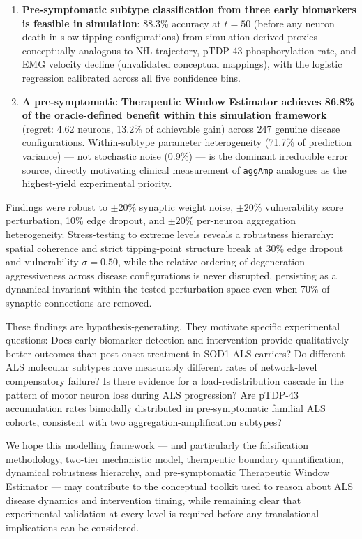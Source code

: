 \documentclass[12pt,a4paper]{article}
\begin{document}
\begin{enumerate}
\item \textbf{Pre-symptomatic subtype classification from three early biomarkers is feasible in
simulation}: 88.3\% accuracy at $t=50$ (before any neuron death in slow-tipping configurations)
from simulation-derived proxies conceptually analogous to NfL trajectory, pTDP-43
phosphorylation rate, and EMG velocity decline (unvalidated conceptual mappings), with the
logistic regression calibrated across all five confidence bins.

\item \textbf{A pre-symptomatic Therapeutic Window Estimator achieves 86.8\% of the oracle-defined
benefit within this simulation framework} (regret: 4.62 neurons, 13.2\% of achievable gain) across 247 genuine disease
configurations. Within-subtype parameter heterogeneity (71.7\% of prediction variance) --- not
stochastic noise (0.9\%) --- is the dominant irreducible error source, directly motivating
clinical measurement of \texttt{aggAmp} analogues as the highest-yield experimental priority.
\end{enumerate}

Findings were robust to $\pm 20\%$ synaptic weight noise, $\pm 20\%$ vulnerability score
perturbation, 10\% edge dropout, and $\pm 20\%$ per-neuron aggregation heterogeneity.
Stress-testing to extreme levels reveals a robustness hierarchy: spatial coherence and strict
tipping-point structure break at 30\% edge dropout and vulnerability $\sigma = 0.50$, while
the relative ordering of degeneration aggressiveness across disease configurations is never
disrupted, persisting as a dynamical invariant within the tested perturbation space even when 70\% of synaptic connections are
removed.

These findings are hypothesis-generating. They motivate specific experimental questions: Does
early biomarker detection and intervention provide qualitatively better outcomes than post-onset
treatment in SOD1-ALS carriers? Do different ALS molecular subtypes have measurably different
rates of network-level compensatory failure? Is there evidence for a load-redistribution cascade
in the pattern of motor neuron loss during ALS progression? Are pTDP-43 accumulation rates
bimodally distributed in pre-symptomatic familial ALS cohorts, consistent with two
aggregation-amplification subtypes?

We hope this modelling framework --- and particularly the falsification methodology, two-tier
mechanistic model, therapeutic boundary quantification, dynamical robustness hierarchy, and
pre-symptomatic Therapeutic Window Estimator --- may contribute to the conceptual toolkit used
to reason about ALS disease dynamics and intervention timing, while remaining clear that
experimental validation at every level is required before any translational implications can
be considered.
\end{document}
